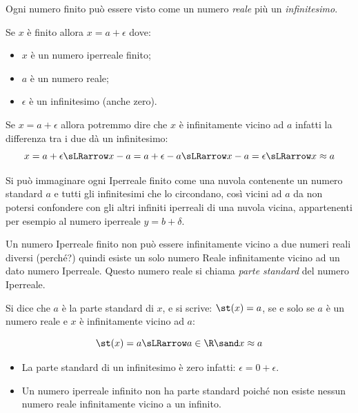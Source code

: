 Ogni numero finito può essere visto come un numero \emph{reale} 
più un \emph{infinitesimo}.

Se $x$ è finito allora $x = a + \epsilon$ dove:
\begin{itemize} [noitemsep]
 \item \(x\) è un numero iperreale finito;
 \item \(a\) è un numero reale;
 \item \(\epsilon\) è un infinitesimo (anche zero).
\end{itemize}

Se \(x=a+\epsilon\) allora potremmo dire che \(x\) è infinitamente vicino 
ad \(a\) infatti la differenza tra i due dà un infinitesimo: 
\[x=a+\epsilon \sLRarrow
x-a = a+\epsilon-a \sLRarrow x-a = \epsilon \sLRarrow x \approx a\] 

Si può immaginare ogni Iperreale finito come una
nuvola contenente un numero standard $a$ e tutti gli infinitesimi che lo 
circondano, così vicini ad $a$ da non potersi confondere con gli altri 
infiniti iperreali di una nuvola vicina, appartenenti per esempio al numero 
iperreale $y=b+\delta$. 

Un numero Iperreale finito non può essere infinitamente vicino 
a due numeri reali diversi (perché?) quindi esiste un solo numero Reale 
infinitamente vicino ad un dato numero Iperreale. 
Questo numero reale si chiama \emph{parte standard} del numero Iperreale.

% 

\begin{definizione}
 Si dice che \(a\) è la parte standard di \(x\), e si scrive: 
 \(\st(x) = a\), se e solo se \(a\) è un numero reale e \(x\) è 
infinitamente vicino ad \(a\):

\[\st(x) = a \sLRarrow a \in \R \sand x \approx a\]
\end{definizione}

\begin{osservazione}
\begin{itemize} [nosep]
 \item 
La parte standard di un infinitesimo è zero infatti:
\(\epsilon = 0+\epsilon\).
 \item 
Un numero iperreale infinito non ha parte standard poiché non esiste nessun 
numero reale infinitamente vicino a un infinito.
\end{itemize}
\end{osservazione}

